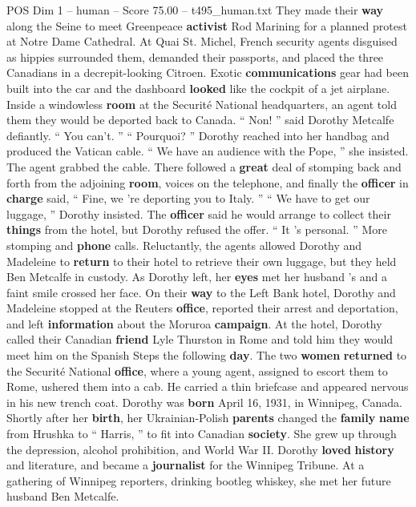 \begin{textsample}{POS Dim 1 – human – Score 75.00 – t495\_human.txt}
They made their \textbf{way} along the Seine to meet Greenpeace \textbf{activist} Rod Marining for a planned protest at Notre Dame Cathedral.
At Quai St.
Michel, French security agents disguised as hippies surrounded them, demanded their passports, and placed the three Canadians in a decrepit-looking Citroen.
Exotic \textbf{communications} gear had been built into the car and the dashboard \textbf{looked} like the cockpit of a jet airplane.
Inside a windowless \textbf{room} at the Securité National headquarters, an agent told them they would be deported back to Canada. “ Non! ” said Dorothy Metcalfe defiantly. “ You can't. ” “ Pourquoi? ” Dorothy reached into her handbag and produced the Vatican cable. “ We have an audience with the Pope, ” she insisted.
The agent grabbed the cable.
There followed a \textbf{great} deal of stomping back and forth from the adjoining \textbf{room}, voices on the telephone, and finally the \textbf{officer} in \textbf{charge} said, “ Fine, we ’re deporting you to Italy. ” “ We have to get our luggage, ” Dorothy insisted.
The \textbf{officer} said he would arrange to collect their \textbf{things} from the hotel, but Dorothy refused the offer. “ It ’s personal. ” More stomping and \textbf{phone} calls.
Reluctantly, the agents allowed Dorothy and Madeleine to \textbf{return} to their hotel to retrieve their own luggage, but they held Ben Metcalfe in custody.
As Dorothy left, her \textbf{eyes} met her husband ’s and a faint smile crossed her face.
On their \textbf{way} to the Left Bank hotel, Dorothy and Madeleine stopped at the Reuters \textbf{office}, reported their arrest and deportation, and left \textbf{information} about the Moruroa \textbf{campaign}.
At the hotel, Dorothy called their Canadian \textbf{friend} Lyle Thurston in Rome and told him they would meet him on the Spanish Steps the following \textbf{day}.
The two \textbf{women} \textbf{returned} to the Securité National \textbf{office}, where a young agent, assigned to escort them to Rome, ushered them into a cab.
He carried a thin briefcase and appeared nervous in his new trench coat.
Dorothy was \textbf{born} April 16, 1931, in Winnipeg, Canada.
Shortly after her \textbf{birth}, her Ukrainian-Polish \textbf{parents} changed the \textbf{family} \textbf{name} from Hrushka to “ Harris, ” to fit into Canadian \textbf{society}.
She grew up through the depression, alcohol prohibition, and World War II.
Dorothy \textbf{loved} \textbf{history} and literature, and became a \textbf{journalist} for the Winnipeg Tribune.
At a gathering of Winnipeg reporters, drinking bootleg whiskey, she met her future husband Ben Metcalfe.

\end{textsample}

